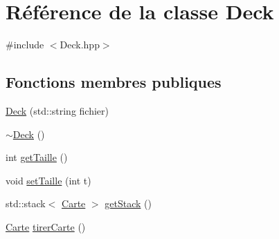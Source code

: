 \hypertarget{class_deck}{\section{\-Référence de la classe \-Deck}
\label{class_deck}
}


{\ttfamily \#include $<$\-Deck.\-hpp$>$}

\subsection*{\-Fonctions membres publiques}
\begin{DoxyCompactItemize}
\item 
\hyperlink{class_deck_abd58d9e32c8bd9fe7a05a12a4882d94c}{\-Deck} (std\-::string fichier)
\item 
\hyperlink{class_deck_a7d1331cc558c302fdf44e5ae8aae1a95}{$\sim$\-Deck} ()
\item 
int \hyperlink{class_deck_a34272f22ad41d349f7b347c07fd0cbb4}{get\-Taille} ()
\item 
void \hyperlink{class_deck_a9374c3f2a2fbd5e75990eee1e2404067}{set\-Taille} (int t)
\item 
std\-::stack$<$ \hyperlink{class_carte}{\-Carte} $>$ \hyperlink{class_deck_ae325fade14ad5ae5912d06d0b85a85af}{get\-Stack} ()
\item 
\hyperlink{class_carte}{\-Carte} \hyperlink{class_deck_a6f6eb6ba96a0b6e04d3a033a6ce409ea}{tirer\-Carte} ()
\end{DoxyCompactItemize}


